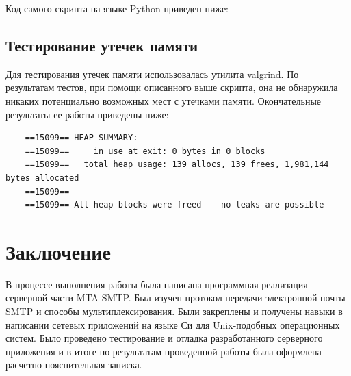 \documentclass[a4paper,12pt]{report}
\begin{document}
Код самого скрипта на языке Python приведен ниже:



\section{Тестирование утечек памяти}

Для тестирования утечек памяти использовалась утилита valgrind. По результатам тестов, при помощи описанного выше скрипта, она не обнаружила никаких потенциально возможных мест с утечками памяти. Окончательные результаты ее работы приведены ниже:
\begin{verbatim}
    ==15099== HEAP SUMMARY:
    ==15099==     in use at exit: 0 bytes in 0 blocks
    ==15099==   total heap usage: 139 allocs, 139 frees, 1,981,144 bytes allocated
    ==15099== 
    ==15099== All heap blocks were freed -- no leaks are possible
\end{verbatim}


\clearpage
\chapter*{Заключение}

В процессе выполнения работы была написана программная реализация серверной части MTA SMTP. Был изучен протокол передачи электронной почты SMTP и способы мультиплексирования. Были закреплены и получены навыки в написании сетевых приложений на языке Си для Unix-подобных операционных систем. Было проведено тестирование и отладка разработанного серверного приложения и в итоге по результатам проведенной работы была оформлена расчетно-пояснительная записка.
\end{document}
